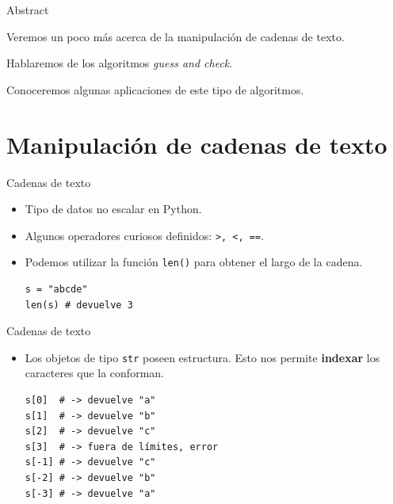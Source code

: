\documentclass[mathserif]{beamer}
\subtitle{\bfseries%
  {Manejo de strings, \textit{guess and check}, métodos de aproximación}\\%
}
\begin{document}


\begin{frame}{Abstract}
    
	\begin{blurb}
		Veremos un poco más acerca de la manipulación de cadenas de texto. 
		
		Hablaremos de los algoritmos \textit{guess and check}. 
		
		Conoceremos algunas aplicaciones de este tipo de algoritmos.
	\end{blurb}
\end{frame}

\section{Manipulación de cadenas de texto}

\begin{frame}[fragile]{Cadenas de texto}
    \begin{itemize}
        \item Tipo de datos {\blue no escalar} en Python. 
        
        \item Algunos operadores curiosos definidos: \lstinline|>, <, ==|.
        
        \item Podemos utilizar la función \lstinline|len()| para obtener el largo de la cadena.
\begin{lstlisting}
s = "abcde"
len(s) # devuelve 3
\end{lstlisting}
    \end{itemize}
\end{frame}

\begin{frame}[fragile]{Cadenas de texto}
    \begin{itemize}
        \item Los objetos de tipo \lstinline|str| poseen estructura. Esto nos permite {\blue\bfseries indexar} los caracteres que la conforman.
\begin{lstlisting}
s[0]  # -> devuelve "a"
s[1]  # -> devuelve "b"
s[2]  # -> devuelve "c"
s[3]  # -> fuera de límites, error
s[-1] # -> devuelve "c"
s[-2] # -> devuelve "b"
s[-3] # -> devuelve "a"
\end{lstlisting}
        
    \end{itemize}
\end{frame}
\end{document}
